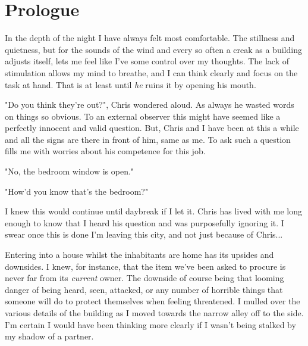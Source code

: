 \chapter*{Prologue} 


In the depth of the night I have always felt most comfortable. The stillness and
quietness, but for the sounds of the wind and every so often a creak as a
building adjusts itself, lets me feel like I've some control over my thoughts.
The lack of stimulation allows my mind to breathe, and I can think clearly and
focus on the task at hand. That is at least until \textit{he} ruins it by
opening his mouth. 

\begin{dialogue}
    \item{"Do you think they're out?", Chris wondered aloud. As always he wasted
    words on things so obvious.
    To an external observer this might have seemed like a perfectly innocent and valid
    question. But, Chris and I have been at this a while and all the signs are
    there in front of him, same as me. To ask such a question fills me with
    worries about his competence for this job.}
    \item {"No, the bedroom window is open."}
    \item {"How'd you know that's the bedroom?"}
\end{dialogue}

I knew this would continue until daybreak if I let it. Chris has lived with me
long enough to know that I heard his question and was purposefully ignoring it.
I swear once this is done I'm leaving this city, and not just because of Chris...

Entering into a house whilst the inhabitants are home has its upsides and
downsides. I knew, for instance, that the item we've been asked to procure is
never far from its \textit{current} owner. The downside of course being that
looming danger of being heard, seen, attacked, or any number of horrible things
that someone will do to protect themselves when feeling threatened. I mulled
over the various details of the building as I moved towards the narrow alley off
to the side. I'm certain I would have been thinking more clearly if I wasn't
being stalked by my shadow of a partner.

